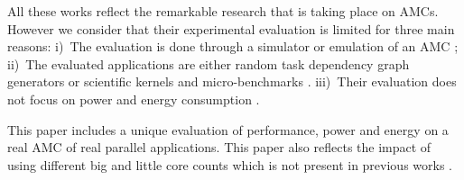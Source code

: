 

All these works reflect the remarkable research that is taking place on AMCs. 
However we consider that their experimental evaluation is limited for three main reasons:
i)~The evaluation is done through a simulator or emulation of an AMC 
\cite{Kumar_micro_2003, Morad_area_based, Balakrishnan:ISCA2005, 
	Koufaty_bias, VanCraeynest_fairness, VanCraeynest_PIE, Rodrigues_thread_scheduling, Hetero93, 
	Hetero95, Dup09, Suleman:APLOS2009, Joao:ASPLOS2012,Joao:ISCA2013};
ii)~The evaluated applications are either random task dependency graph generators or scientific 
kernels and micro-benchmarks \cite{Hetero93,HEFT,LDCP}.
iii)~Their evaluation does not focus on power and energy consumption 
\cite{Kumar:ISCA2004, 
	VanCraeynest_fairness, VanCraeynest_PIE, Hetero95, Chronaki:ICS2015}.

This paper includes a unique evaluation of performance, power and energy on a real AMC of real parallel applications.
This paper also reflects the impact of using different big and little core counts which is not present in previous works \cite{Cong_quickIA}.



